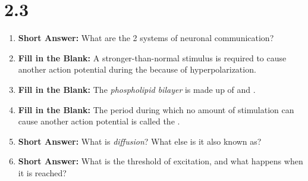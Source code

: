 \section*{2.3}
\begin{enumerate}[label=\textbf{Q2.3.\arabic*}]


      \item \textbf{Short Answer:} What are the 2 systems of neuronal communication? \\

      \item \textbf{Fill in the Blank:} A stronger-than-normal stimulus is required to cause another action potential during the  because of hyperpolarization. \\
            

      \item \textbf{Fill in the Blank:} The \textit{phospholipid bilayer} is made up of  and . \\

      \item \textbf{Fill in the Blank:} The period during which no amount of stimulation can cause another action potential is called the . \\

      \item \textbf{Short Answer:} What is \textit{diffusion}? What else is it also known as? \\

      \item \textbf{Short Answer:} What is the threshold of excitation, and what happens when it is reached? \\

\newpage


\end{enumerate}
